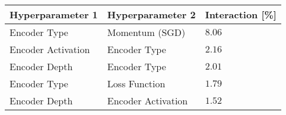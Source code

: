 \begin{tabular}{lll}
\toprule
Hyperparameter 1 & Hyperparameter 2 & Interaction [\%] \\
\midrule
Encoder Type & Momentum (SGD) & $8.06$ \\
Encoder Activation & Encoder Type & $2.16$ \\
Encoder Depth & Encoder Type & $2.01$ \\
Encoder Type & Loss Function & $1.79$ \\
Encoder Depth & Encoder Activation & $1.52$ \\
\bottomrule
\end{tabular}
